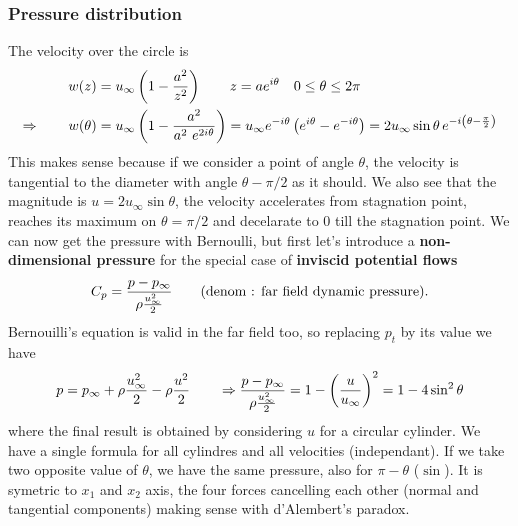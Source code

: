 	\subsubsection{Pressure distribution}
		The velocity over the circle is 
		\begin{equation}
		\begin{aligned}
			w(z) &= u_\infty \left( 1-\frac{a^2}{z^2}\right) \qquad z = ae^{i\theta}\quad 0\leq \theta \leq 2\pi \\
			\Rightarrow \qquad w(\theta ) &= u_\infty \left( 1 - \frac{a^2}{a^2 \ e^{2i\theta}} \right)
 = u_\infty  e^{-i\theta} \left( e^{i\theta} - e^{-i\theta} \right) 
= 2  u_\infty  \sin \theta \,  e^{-i \left(\theta - \frac{\pi}{2}\right)}
		\end{aligned}
		\end{equation}
		This makes sense because if we consider a point of angle $\theta$, the velocity is tangential to the diameter with angle $\theta - \pi /2$ as it should. We also see that the magnitude is $u = 2  u_\infty  \sin \theta$, the velocity accelerates from stagnation point, reaches its maximum on $\theta = \pi /2$ and decelarate to 0 till the stagnation point. We can now get the pressure with Bernoulli, but first let's introduce a \textbf{non-dimensional pressure} for the special case of \textbf{inviscid potential flows}
		\begin{equation}
			C_p = \frac{p-p_\infty}{\rho \frac{u_\infty ^2}{2}} \qquad \mbox{(denom : far field dynamic pressure)}.
		\end{equation}
		Bernouilli's equation is valid in the far field too, so replacing $p_t$ by its value we have
		\begin{equation}
			p = p _\infty + \rho\frac{u_\infty ^2}{2}- \rho\frac{u^2}{2} \qquad \Rightarrow \frac{p-p_\infty}{\rho \frac{u_\infty ^2}{2}} = 1- \left(\frac{u}{u_\infty}\right) ^2 = 1 - 4\sin ^2 \theta
		\end{equation}
		where the final result is obtained by considering $u$ for a circular cylinder. We have a single formula for all cylindres and all velocities (independant). If we take two opposite value of $\theta$, we have the same pressure, also for $\pi - \theta$ ($\sin$). It is symetric to $x_1$ and $x_2$ axis, the four forces cancelling each other (normal and tangential components) making sense with d'Alembert's paradox. 
		
